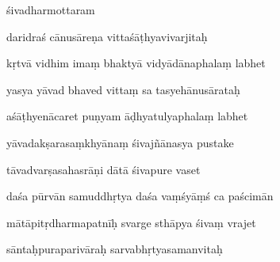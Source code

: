 \renewcommand{\dnapp}[1]{}\renewcommand{\rmapp}[1]{#1}
\begin{center}{\Huge  śivadharmottaram}\end{center}\ujfej\szam\bek


\vers

daridraś cānusāreṇa vittaśāṭhyavivarjitaḥ \thinspace{\dandab} \dontdisplaylinenum

kṛtvā vidhim imaṃ bhaktyā vidyādānaphalaṃ labhet  \veg\dontdisplaylinenum

yasya yāvad bhaved vittaṃ sa tasyehānusārataḥ \thinspace{\dandab} \dontdisplaylinenum

aśāṭhyenācaret puṇyam āḍhyatulyaphalaṃ labhet  \veg\dontdisplaylinenum

yāvadakṣarasaṃkhyānaṃ śivajñānasya pustake \thinspace{\dandab} \dontdisplaylinenum

tāvadvarṣasahasrāṇi dātā śivapure vaset  \veg\dontdisplaylinenum

daśa pūrvān samuddhṛtya daśa vaṃśyāṃś ca paścimān \thinspace{\dandab} \dontdisplaylinenum
    
mātāpitṛdharmapatnīḥ svarge sthāpya śivaṃ vrajet  \veg\dontdisplaylinenum

sāntaḥpuraparivāraḥ sarvabhṛtyasamanvitaḥ \thinspace{\dandab} \dontdisplaylinenum

